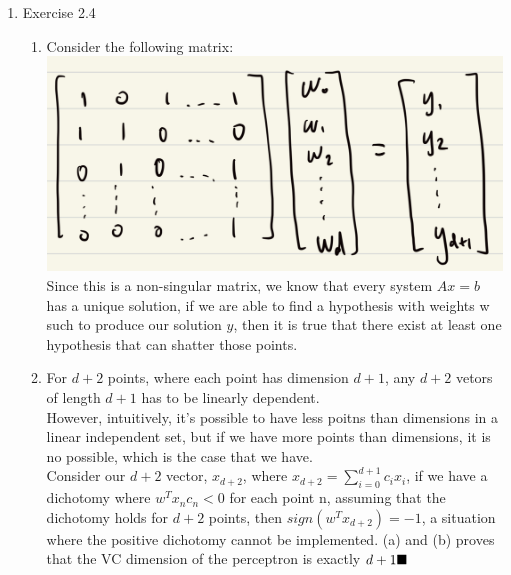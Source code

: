 \documentclass{article}
\begin{document}
    \begin{enumerate}
        \item Exercise 2.4
        \begin{enumerate}
            \item Consider the following matrix:\\
            \includegraphics[scale=0.25]{img/2_4.jpeg}\\
            Since this is a non-singular matrix, we know that every system $Ax = b$ has a unique solution, if we are able to find a hypothesis with weights w such to produce our solution $y$, then it is true that there exist at least one hypothesis that can shatter those points.
            
            \item For $d+2$ points, where each point has dimension $d + 1$, any $d + 2$ vetors of length $d + 1$ has to be linearly dependent.\\
            However, intuitively, it's possible to have less poitns than dimensions in a linear independent set, but if we have more points than dimensions, it is no possible, which is the case that we have.\\
            Consider our $d + 2$ vector, $x_{d+2}$, where $x_{d+2} = \sum_{i = 0}^{d + 1} c_ix_i$, if we have a dichotomy where $w^Tx_nc_n <0$ for each point n, assuming that the dichotomy holds for $d+2$ points, then $sign(w^Tx_{d+2}) = -1$, a situation where the positive dichotomy cannot be implemented. (a) and (b) proves that the VC dimension of the perceptron is exactly $d+1 \hfill \blacksquare$
        \end{enumerate}


\end{enumerate}
\end{document}
